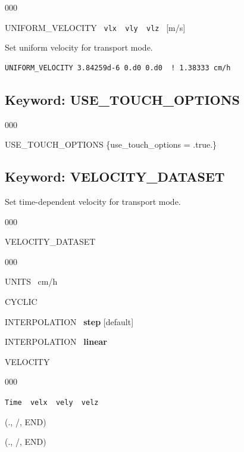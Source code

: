 \documentclass[12pt]{article}
\begin{document}
\begin{deflist}{000}
\item[UNIFORM\_VELOCITY] \ {\tt vlx \ vly \ vlz} \ [m/s]
\end{deflist}

 Set uniform velocity for transport mode.

\begin{verbatim}
UNIFORM_VELOCITY 3.84259d-6 0.d0 0.d0  ! 1.38333 cm/h
\end{verbatim}


\newpage
\protect\hypertarget{target_touch}{}

\subsection{Keyword: USE\_TOUCH\_OPTIONS}


\begin{deflist}{000}
\item[USE\_TOUCH\_OPTIONS] \{use\_touch\_options = .true.\}
\end{deflist}




\newpage
\protect\hypertarget{target_veldata}{}

\subsection{Keyword: VELOCITY\_DATASET}

 Set time-dependent velocity for transport mode.

\begin{deflist}{000}
\item[VELOCITY\_DATASET] ~
\begin{deflist}{000}
\item[UNITS] \ cm/h
\item[CYCLIC]
\item[INTERPOLATION] \ {\bf step} [default]
\item[INTERPOLATION] \ {\bf linear}
\item[VELOCITY] ~
\begin{deflist}{000}
\item[{\tt Time \ velx \ vely \ velz}]
\end{deflist}
\item[(., /, END)]
\end{deflist}
\item[(., /, END)]
\end{deflist}
\end{document}
